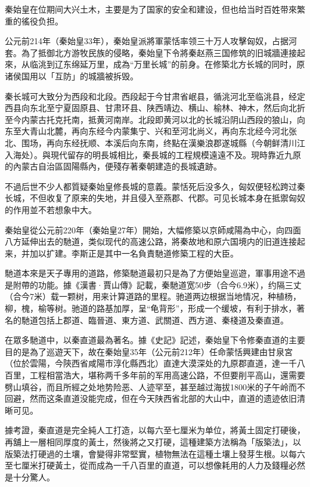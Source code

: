 秦始皇在位期间大兴土木，主要是为了国家的安全和建设，但也给当时百姓带來繁重的徭役负担。

公元前214年（秦始皇33年），秦始皇派將軍蒙恬率领三十万人攻擊匈奴，占据河套。為了抵御北方游牧民族的侵略，秦始皇下令將秦赵燕三国修筑的旧城牆連接起來，从临洮到辽东绵延万里，成為“万里长城”的前身。在修築北方长城的同时，原诸侯国用以「互防」的城牆被拆毁。

秦长城可大致分为西段和北段。西段起于今甘肃省岷县，循洮河北至临洮县，经定西县向东北至宁夏固原县、甘肃环县、陕西靖边、横山、榆林、神木，然后向北折至今内蒙古托克托南，抵黄河南岸。北段即黄河以北的长城沿阴山西段的狼山，向东至大青山北麓，再向东经今内蒙集宁、兴和至河北尚义，再向东北经今河北张北、围场，再向东经抚顺、本溪后向东南，终點在漢樂浪郡遂城縣（今朝鲜清川江入海处）。與現代留存的明長城相比，秦長城的工程規模遠遠不及。現時靠近九原的內蒙古自治區固陽縣內，便殘存著秦朝建造的長城遺跡。

不過后世不少人都質疑秦始皇修長城的意義。蒙恬死后没多久，匈奴便轻松跨过秦长城，不但收复了原来的失地，并且侵入至燕郡、代郡。可见长城本身在抵禦匈奴的作用並不若想象中大。

秦始皇從公元前220年（秦始皇27年）開始，大幅修築以京師咸陽為中心，向四面八方延伸出去的馳道，类似现代的高速公路，將秦故地和原六国境内的旧道连接起来，并加以扩建。李斯正是其中一名負責馳道修築工程的大臣。

馳道本來是天子專用的道路，修築馳道最初只是為了方便始皇巡遊，軍事用途不過是附帶的功能。據《漢書·賈山傳》記載，秦馳道宽50步（合今6.9米），约隔三丈（合今7米）载一颗树，用来计算道路的里程。驰道两边根据当地情况，种植杨，柳，槐，榆等树。驰道的路基加厚，呈“龟背形”，形成一个缓坡，有利于排水，著名的馳道包括上郡道、臨晉道、東方道、武關道、西方道、秦棧道及秦直道。

在眾多馳道中，以秦直道最為著名。據《史記》記述，秦始皇下令修秦直道的主要目的是為了巡遊天下，故在秦始皇35年（公元前212年）任命蒙恬興建由甘泉宮（位於雲陽，今陝西省咸陽市淳化縣西北）直達大漠深处的九原郡直道，達一千八百里，工程相當浩大，堪称两千多年前的军用高速公路，不但要削平高山，還需要劈山填谷，而且所經之处地势险恶、人迹罕至，甚至越过海拔1800米的子午岭而不回避，然而这条直道没能完成，但在今天陕西省北部的大山中，直道的遗迹依旧清晰可见。

據考證，秦直道是完全純人工打造，以每六至七厘米为单位，將黃土固定打硬後，再舖上一層相同厚度的黃土，然後將之又打硬，這種建築方法稱為「版築法」，以版築法打硬過的土壤，會變得非常堅實，植物無法在這種土壤上發芽生根。以每六至七厘米打硬黃土，從而成為一千八百里的直道，可以想像耗用的人力及錢糧必然是十分驚人。

